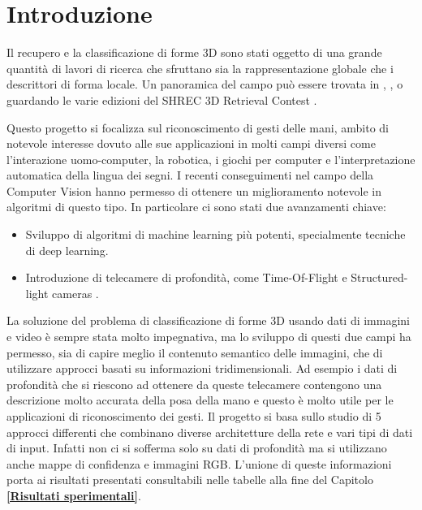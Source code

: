 \chapter{Introduzione}
\label{introduzione}

Il recupero e la classificazione di forme 3D sono stati oggetto di una grande quantità di lavori di ricerca che sfruttano sia la rappresentazione globale che i descrittori di forma locale. Un panoramica del campo può essere trovata in \cite{Tangelder2007}, \cite{YulanGuo2014}, \cite{BoYijuan} o guardando le varie edizioni del SHREC 3D Retrieval Contest \cite{ShrecContest}. 

Questo progetto si focalizza sul riconoscimento di gesti delle mani, ambito di notevole interesse dovuto alle sue applicazioni in molti campi diversi come l'interazione uomo-computer, la robotica, i giochi per computer e l'interpretazione automatica della lingua dei segni.
I recenti conseguimenti nel campo della Computer Vision hanno permesso di ottenere un miglioramento notevole in algoritmi di questo tipo. In particolare ci sono stati due avanzamenti chiave:

\begin{itemize}
\item Sviluppo di algoritmi di machine learning più potenti, specialmente tecniche di deep learning.
\item Introduzione di telecamere di profondità, come Time-Of-Flight e Structured-light cameras \cite{DalMutto2012}.
\end{itemize}

La soluzione del problema di classificazione di forme 3D usando dati di immagini e video è sempre stata molto impegnativa, ma lo sviluppo di questi due campi ha permesso, sia di capire meglio il contenuto semantico delle immagini, che di utilizzare approcci basati su informazioni tridimensionali. Ad esempio i dati di profondità che si riescono ad ottenere da queste telecamere contengono una descrizione molto accurata della posa della mano e questo è molto utile per le applicazioni di riconoscimento dei gesti.
Il progetto si basa sullo studio di 5 approcci differenti che combinano diverse architetture della rete e vari tipi di dati di input. Infatti non ci si sofferma solo su dati di profondità ma si utilizzano anche mappe di confidenza e immagini RGB. L'unione di queste informazioni porta ai risultati presentati consultabili nelle tabelle alla fine del Capitolo \textbf{\ref{Risultati sperimentali}}.\\

